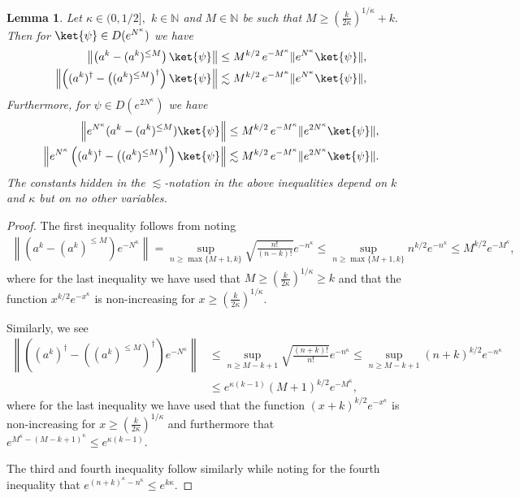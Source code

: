 \documentclass[11pt]{amsart}
\newcommand{\1}{\mathbbm{1}}
\newcommand{\N}{\mathbb{N}}
\newcommand{\bin}[1]{}
\theoremstyle{plain}
\newtheorem{lemma}[theorem]{Lemma}
\theoremstyle{definition}
\theoremstyle{remark}
\numberwithin{equation}{section}
\begin{document}
\begin{lemma}
\label{lem:FiniteTruncBareJumps}
Let $\kappa\in(0,1/2],$ $k\in\N$ and $M\in\N$ be such that  $M\ge \left(\frac{k}{2\kappa}\right)^{1/\kappa}+k.$ \bin{$r\ge M^{-1/2}.$} Then for $\ket{\psi}\in D(e^{N^\kappa})$ we have
\begin{align*}
    \left\|\left(a^k - (a^k)^{\le M}\right) \ket{\psi}\right\| &\le M^{k/2}\,e^{-M^{\kappa}}\| e^{N^\kappa} \ket{\psi}\|, \\\left\|\left((a^k)^\dagger - \left((a^k)^{\le M}\right)^\dagger\right) \ket{\psi}\right\| &\lesssim M^{k/2}
    \,e^{-M^{\kappa}}\| e^{N^{\kappa}} \ket{\psi}\|,
\end{align*}
Furthermore, for $\psi\in D(e^{2N^{\kappa}})$ we have
\begin{align*}    \left\|e^{N^{\kappa}}(a^k - (a^k)^{\le M}) \ket{\psi}\right\| &\le M^{k/2}\,e^{-M^{\kappa}}\| e^{2N^{\kappa}} \ket{\psi}\|,\\
     \left\|e^{N^{\kappa}}\left((a^k)^\dagger - \left((a^k)^{\le M}\right)^\dagger\right) \ket{\psi}\right\| &\lesssim M^{k/2}
    \,e^{-M^{\kappa}}\| e^{2N^{\kappa}} \ket{\psi}\|.
\end{align*}
 The constants hidden in the $\lesssim$-notation in the above inequalities depend on $k$ and $\kappa$ but on no other variables.
\end{lemma}

\begin{proof}
The first inequality follows from noting
    \begin{align*}
    \left\|(a^k- (a^k)^{\le M}) e^{-N^{\kappa}}\right\| = \sup_{n\ge \max\{M+1,k\}} \sqrt{\frac{n!}{(n-k)!}} e^{-n^\kappa}\le \sup_{n\ge \max\{M+1,k\}} n^{k/2} e^{-n^\kappa}\le M^{k/2}e^{-M^{\kappa}},
\end{align*}
where for the last inequality we have used that $M\ge \left(\frac{k}{2\kappa}\right)^{1/\kappa}\ge k$ and  that the function $ x^{k/2}e^{-x^{\kappa}}$ is non-increasing for $x\ge \left(\frac{k}{2\kappa}\right)^{1/\kappa}.$

Similarly, we see
\begin{align*}
\left\|\left((a^k)^\dagger - \left((a^k)^{\le M}\right)^\dagger\right)e^{-N^\kappa}\right\|&\le \sup_{n\ge M-k+1}\sqrt{\frac{(n+k)!}{n!}}e^{-n^{\kappa}} \le \sup_{n\ge M-k+1}(n+k)^{k/2}e^{-n^{\kappa}}   \\&\le e^{\kappa(k-1)}(M+1)^{k/2}e^{-M^{\kappa}},
\end{align*}
where for the last inequality we have used that the function $(x+k)^{k/2}e^{-x^\kappa}$ is non-increasing for $x\ge \left(\frac{k}{2\kappa}\right)^{1/\kappa}$ and furthermore that $e^{M^{\kappa}-(M-k+1)^\kappa}\le e^{\kappa(k-1)}.$

The third and fourth inequality follow similarly while noting for the fourth inequality that $e^{(n+k)^{\kappa}-n^\kappa}\le e^{k\kappa}.$
\end{proof}
\end{document}
